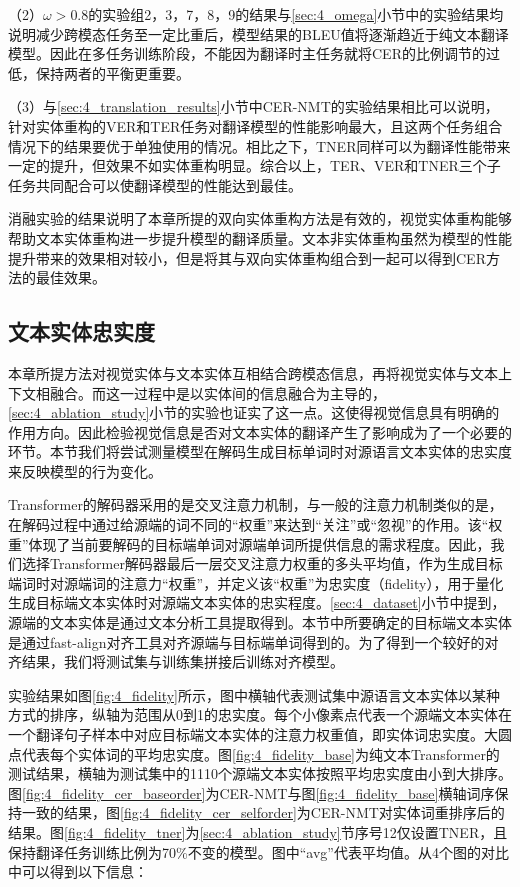 （2）$\omega>0.8$的实验组2，3，7，8，9的结果与\ref{sec:4_omega}小节中的实验结果均说明减少跨模态任务至一定比重后，模型结果的BLEU值将逐渐趋近于纯文本翻译模型。因此在多任务训练阶段，不能因为翻译时主任务就将CER的比例调节的过低，保持两者的平衡更重要。

（3）与\ref{sec:4_translation_results}小节中CER-NMT的实验结果相比可以说明，针对实体重构的VER和TER任务对翻译模型的性能影响最大，且这两个任务组合情况下的结果要优于单独使用的情况。相比之下，TNER同样可以为翻译性能带来一定的提升，但效果不如实体重构明显。综合以上，TER、VER和TNER三个子任务共同配合可以使翻译模型的性能达到最佳。

消融实验的结果说明了本章所提的双向实体重构方法是有效的，视觉实体重构能够帮助文本实体重构进一步提升模型的翻译质量。文本非实体重构虽然为模型的性能提升带来的效果相对较小，但是将其与双向实体重构组合到一起可以得到CER方法的最佳效果。

\subsection{文本实体忠实度}
\label{sec:4_fidelity}
本章所提方法对视觉实体与文本实体互相结合跨模态信息，再将视觉实体与文本上下文相融合。而这一过程中是以实体间的信息融合为主导的，\ref{sec:4_ablation_study}小节的实验也证实了这一点。这使得视觉信息具有明确的作用方向。因此检验视觉信息是否对文本实体的翻译产生了影响成为了一个必要的环节。本节我们将尝试测量模型在解码生成目标单词时对源语言文本实体的忠实度来反映模型的行为变化。


Transformer的解码器采用的是交叉注意力机制，与一般的注意力机制类似的是，在解码过程中通过给源端的词不同的“权重”来达到“关注”或“忽视”的作用。该“权重”体现了当前要解码的目标端单词对源端单词所提供信息的需求程度。因此，我们选择Transformer解码器最后一层交叉注意力权重的多头平均值，作为生成目标端词时对源端词的注意力“权重”，并定义该“权重”为忠实度（fidelity），用于量化生成目标端文本实体时对源端文本实体的忠实程度。\ref{sec:4_dataset}小节中提到，源端的文本实体是通过文本分析工具提取得到。本节中所要确定的目标端文本实体是通过fast-align\cite{45_dyer-etal-2013-simple}对齐工具对齐源端与目标端单词得到的。为了得到一个较好的对齐结果，我们将测试集与训练集拼接后训练对齐模型。

实验结果如图\ref{fig:4_fidelity}所示，图中横轴代表测试集中源语言文本实体以某种方式的排序，纵轴为范围从0到1的忠实度。每个小像素点代表一个源端文本实体在一个翻译句子样本中对应目标端文本实体的注意力权重值，即实体词忠实度。大圆点代表每个实体词的平均忠实度。图\ref{fig:4_fidelity_base}为纯文本Transformer的测试结果，横轴为测试集中的1110个源端文本实体按照平均忠实度由小到大排序。图\ref{fig:4_fidelity_cer_baseorder}为CER-NMT与图\ref{fig:4_fidelity_base}横轴词序保持一致的结果，图\ref{fig:4_fidelity_cer_selforder}为CER-NMT对实体词重排序后的结果。图\ref{fig:4_fidelity_tner}为\ref{sec:4_ablation_study}节序号12仅设置TNER，且保持翻译任务训练比例为70\%不变的模型。图中“avg”代表平均值。从4个图的对比中可以得到以下信息：

